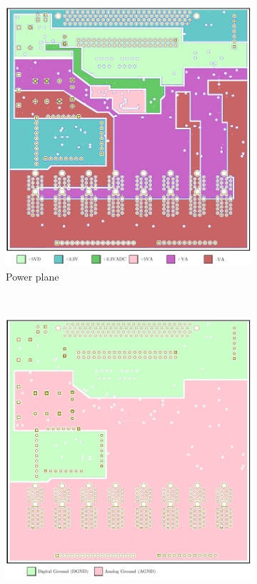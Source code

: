 \begin{figure}[h]
	\centering 
	\begin{singlespace}
	\begin{subfigure}[b]{0.35\textwidth}
		\centering 
		\includegraphics[trim=1in 1.25in 3in 3.5in,clip,width=\textwidth]{./figures/PCBCopperPWR} %
	\caption{Power plane\label{fig:vitalPWR}}
	\end{subfigure}
	~
	\begin{subfigure}[b]{0.35\textwidth}
		\centering 
		\includegraphics[trim=0.9in 4.7in 3.25in 0in,clip,width=\textwidth]{./figures/PCBCopperGND} %

\end{subfigure}
\end{singlespace}
\end{figure}
